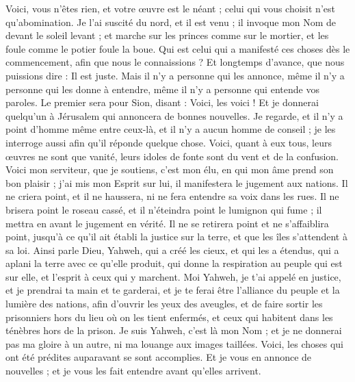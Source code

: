 \begin{multicols}{2}
Voici, vous n'êtes rien, et votre œuvre est le néant ; celui qui vous choisit n'est qu'abomination.
Je l'ai suscité du nord, et il est venu ; il invoque mon Nom de devant le soleil levant ; et marche sur les princes comme sur le mortier, et les foule comme le potier foule la boue.
Qui est celui qui a manifesté ces choses dès le commencement, afin que nous le connaissions ? Et longtemps d'avance, que nous puissions dire : Il est juste. Mais il n'y a personne qui les annonce, même il n'y a personne qui les donne à entendre, même il n'y a personne qui entende vos paroles.
Le premier sera pour Sion, disant : Voici, les voici ! Et je donnerai quelqu'un à Jérusalem qui annoncera de bonnes nouvelles.
Je regarde, et il n'y a point d'homme même entre ceux-là, et il n'y a aucun homme de conseil ; je les interroge aussi afin qu'il réponde quelque chose. 
Voici, quant à eux tous, leurs œuvres ne sont que vanité, leurs idoles de fonte sont du vent et de la confusion.
\VerseOne{}Voici mon serviteur, que je soutiens, c'est mon élu, en qui mon âme prend son bon plaisir ; j'ai mis mon Esprit sur lui, il manifestera le jugement aux nations.
Il ne criera point, et il ne haussera, ni ne fera entendre sa voix dans les rues.
Il ne brisera point le roseau cassé, et il n'éteindra point le lumignon qui fume ; il mettra en avant le jugement en vérité.
Il ne se retirera point et ne s'affaiblira point, jusqu'à ce qu'il ait établi la justice sur la terre, et que les îles s'attendent à sa loi.
Ainsi parle Dieu, Yahweh, qui a créé les cieux, et qui les a étendus, qui a aplani la terre avec ce qu'elle produit, qui donne la respiration au peuple qui est sur elle, et l'esprit à ceux qui y marchent.
Moi Yahweh, je t'ai appelé en justice, et je prendrai ta main et te garderai, et je te ferai être l'alliance du peuple et la lumière des nations,
afin d'ouvrir les yeux des aveugles, et de faire sortir les prisonniers hors du lieu où on les tient enfermés, et ceux qui habitent dans les ténèbres hors de la prison.
Je suis Yahweh, c'est là mon Nom ; et je ne donnerai pas ma gloire à un autre, ni ma louange aux images taillées.
Voici, les choses qui ont été prédites auparavant se sont accomplies. Et je vous en annonce de nouvelles ; et je vous les fait entendre avant qu'elles arrivent.

\end{multicols}
